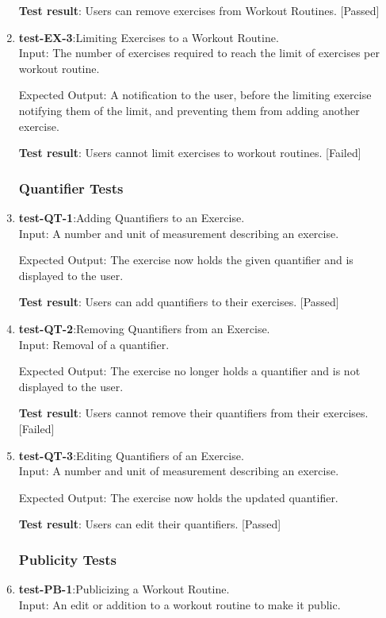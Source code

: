 \documentclass[12pt, titlepage]{article}
\begin{document}
\begin{enumerate}
    \textbf{Test result}: Users can remove exercises from Workout Routines. [Passed]
   
    \item{\textbf{test-EX-3}}:Limiting Exercises to a Workout Routine.\\
    Input: The number of exercises required to reach the limit of exercises per workout routine. 
	
    Expected Output: A notification to the user, before the limiting exercise notifying them of the limit, and preventing them from adding another exercise.
    
    \textbf{Test result}: Users cannot limit exercises to workout routines. [Failed]
   
\subsubsection{Quantifier Tests}
    \item{\textbf{test-QT-1}}:Adding Quantifiers to an Exercise.\\
    Input: A number and unit of measurement describing an exercise.
	
    Expected Output: The exercise now holds the given quantifier and is displayed to the user.
    
    \textbf{Test result}: Users can add quantifiers to their exercises. [Passed]
   
    \item{\textbf{test-QT-2}}:Removing Quantifiers from an Exercise.\\
    Input: Removal of a quantifier.
	
    Expected Output: The exercise no longer holds a quantifier and is not displayed to the user.
    
    \textbf{Test result}: Users cannot remove their quantifiers from their exercises. [Failed]
   
    \item{\textbf{test-QT-3}}:Editing Quantifiers of an Exercise.\\
    Input: A number and unit of measurement describing an exercise.

    Expected Output: The exercise now holds the updated quantifier.
    
    \textbf{Test result}: Users can edit their quantifiers. [Passed]
   
\subsubsection{Publicity Tests}
    \item{\textbf{test-PB-1}}:Publicizing a Workout Routine.\\
    Input: An edit or addition to a workout routine to make it public.
	

\end{enumerate}
\end{document}
